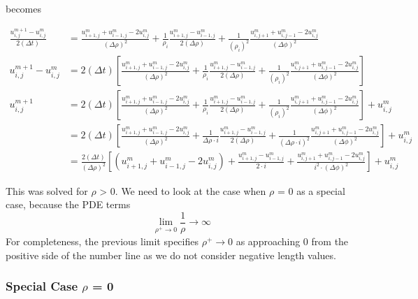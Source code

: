 \documentclass[11pt]{article}
\begin{document}
becomes

\begin{equation}
\begin{split}
\frac{u_{i,j}^{m + 1} - u_{i,j}^{m}}{2 (\Delta t)} &= \frac{u_{i + 1 ,j}^m + u_{i - 1 ,j}^m - 2 u_{i,j}^m}{(\Delta \rho)^2} + 
\frac{1}{\rho_i} \frac{u_{i + 1,j}^{m} - u_{i -1 ,j}^{m}}{2 (\Delta \rho)} +
\frac{1}{(\rho_i)^2} \frac{u_{i,j + 1}^m + u_{i,j - 1}^m - 2 u_{i,j}^m}{(\Delta \phi)^2} \\
u_{i,j}^{m + 1} - u_{i,j}^{m} &= 2 (\Delta t) \left[\frac{u_{i + 1 ,j}^m + u_{i - 1 ,j}^m - 2 u_{i,j}^m}{(\Delta \rho)^2} + 
\frac{1}{\rho_i} \frac{u_{i + 1,j}^{m} - u_{i -1 ,j}^{m}}{2 (\Delta \rho)} +
\frac{1}{(\rho_i)^2} \frac{u_{i,j + 1}^m + u_{i,j - 1}^m - 2 u_{i,j}^m}{(\Delta \phi)^2} \right]  \\
u_{i,j}^{m + 1} &= 2 (\Delta t) \left[\frac{u_{i + 1 ,j}^m + u_{i - 1 ,j}^m - 2 u_{i,j}^m}{(\Delta \rho)^2} + 
\frac{1}{\rho_i} \frac{u_{i + 1,j}^{m} - u_{i -1 ,j}^{m}}{2 (\Delta \rho)} +
\frac{1}{(\rho_i)^2} \frac{u_{i,j + 1}^m + u_{i,j - 1}^m - 2 u_{i,j}^m}{(\Delta \phi)^2} \right] +  u_{i,j}^{m} \\
&= 2 (\Delta t) \left[\frac{u_{i + 1 ,j}^m + u_{i - 1 ,j}^m - 2 u_{i,j}^m}{(\Delta \rho)^2} + 
\frac{1}{\Delta \rho \cdot i} \frac{u_{i + 1,j}^{m} - u_{i -1 ,j}^{m}}{2 (\Delta \rho)} +
\frac{1}{(\Delta \rho \cdot i)^2} \frac{u_{i,j + 1}^m + u_{i,j - 1}^m - 2 u_{i,j}^m}{(\Delta \phi)^2} \right] +  u_{i,j}^{m} \\
&= \frac{2 (\Delta t)}{(\Delta \rho)^2} \left[\left (u_{i + 1 ,j}^m + u_{i - 1 ,j}^m - 2 u_{i,j}^m \right) + 
\frac{u_{i + 1,j}^{m} - u_{i -1 ,j}^{m}}{2 \cdot i} +
\frac{u_{i,j + 1}^m + u_{i,j - 1}^m - 2 u_{i,j}^m}{i^2 \cdot (\Delta \phi)^2} \right] +  u_{i,j}^{m} 
\end{split}
\end{equation}

This was solved for \(\rho\) \textgreater{} 0. We need to look at the
case when \(\rho\) = 0 as a special case, because the PDE terms
\begin{equation}
\lim_{\rho^{+} \rightarrow 0} \frac{1}{\rho}\rightarrow \infty 
\end{equation} For completeness, the previous limit specifies
\(\rho^{+} \rightarrow 0\) as approaching 0 from the positive side of
the number line as we do not consider negative length values.

    \hypertarget{special-case-rho-0}{%
\subsubsection{\texorpdfstring{Special Case \(\rho\) =
0}{Special Case \textbackslash rho = 0}}\label{special-case-rho-0}}
\end{document}
